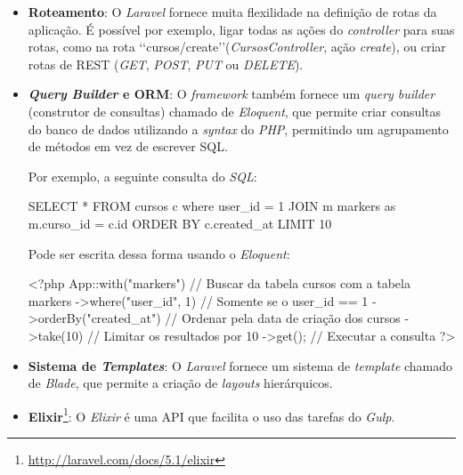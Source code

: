\begin{itemize}
  \item \textbf{Roteamento}: O \textit{Laravel} fornece muita flexilidade na definição de rotas da aplicação. É possível por exemplo, ligar todas as ações do \textit{controller} para suas rotas, como na rota \lq\lq cursos/create\rq\rq (\textit{CursosController}, ação \textit{create}), ou criar rotas de \ac{REST} (\textit{GET}, \textit{POST}, \textit{PUT} ou \textit{DELETE}).
  \item \textbf{\textit{Query Builder} e \ac{ORM}}: O \textit{framework} também fornece um \textit{query builder} (construtor de consultas) chamado de \textit{Eloquent}, que permite criar consultas do banco de dados utilizando a \textit{syntax} do \textit{PHP}, permitindo um agrupamento de métodos em vez de escrever \ac{SQL}.

  Por exemplo, a seguinte consulta do \textit{SQL}:
  \begin{listing}
    \begin{sqlcode}
      SELECT * FROM cursos c where user_id = 1
      JOIN m markers as m.curso_id = c.id
      ORDER BY c.created_at
      LIMIT 10
    \end{sqlcode}
    \caption{Busca simples do SQL. Buscar todos os cursos em que o user\_id seja igual a 1, unir os resultados com a tabela markers, ordenar pela data de criação do curso, e limitar os resultados por 10}
    \label{lst:sql_example_eloquent}
  \end{listing}

  Pode ser escrita dessa forma usando o \textit{Eloquent}:
  \begin{listing}
    \begin{phpcode}
      <?php
      App\Curso::with("markers") // Buscar da tabela cursos com a tabela markers
      ->where("user_id", 1) // Somente se o user_id == 1
      ->orderBy("created_at") // Ordenar pela data de criação dos cursos
      ->take(10) // Limitar os resultados por 10
      ->get(); // Executar a consulta
      ?>
    \end{phpcode}
    \caption{Consulta \ref{lst:sql_example_eloquent} em Eloquent}
    \label{lst:php_example_eloquent}
  \end{listing}

  \item \textbf{Sistema de \textit{Templates}}: O \textit{Laravel} fornece um sistema de \textit{template} chamado de \textit{Blade}, que permite a criação de \textit{layouts} hierárquicos.
  \item \textbf{Elixir}\footnote{\url{http://laravel.com/docs/5.1/elixir}}: O \textit{Elixir} é uma \ac{API} que facilita o uso das tarefas do \textit{Gulp}.
\end{itemize}


